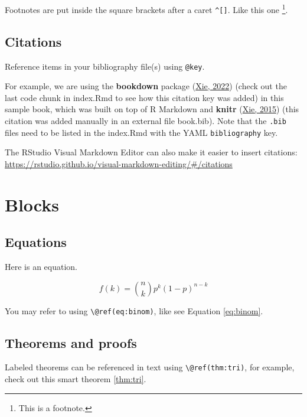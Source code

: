 \documentclass[
  12pt,
]{book}
\theoremstyle{definition}
\theoremstyle{definition}
\theoremstyle{definition}
\theoremstyle{definition}
\theoremstyle{remark}
\begin{document}
Footnotes are put inside the square brackets after a caret \texttt{\^{}{[}{]}}. Like this one \footnote{This is a footnote.}.

\hypertarget{citations}{%
\section{Citations}\label{citations}}

Reference items in your bibliography file(s) using \texttt{@key}.

For example, we are using the \textbf{bookdown} package (\protect\hyperlink{ref-R-bookdown}{Xie, 2022}) (check out the last code chunk in index.Rmd to see how this citation key was added) in this sample book, which was built on top of R Markdown and \textbf{knitr} (\protect\hyperlink{ref-xie2015}{Xie, 2015}) (this citation was added manually in an external file book.bib).
Note that the \texttt{.bib} files need to be listed in the index.Rmd with the YAML \texttt{bibliography} key.

The RStudio Visual Markdown Editor can also make it easier to insert citations: \url{https://rstudio.github.io/visual-markdown-editing/\#/citations}

\hypertarget{blocks}{%
\chapter{Blocks}\label{blocks}}

\hypertarget{equations}{%
\section{Equations}\label{equations}}

Here is an equation. 

\begin{equation} 
  f\left(k\right) = \binom{n}{k} p^k\left(1-p\right)^{n-k}
  \label{eq:binom}
\end{equation}

You may refer to using \texttt{\textbackslash{}@ref(eq:binom)}, like see Equation \eqref{eq:binom}.

\hypertarget{theorems-and-proofs}{%
\section{Theorems and proofs}\label{theorems-and-proofs}}

Labeled theorems can be referenced in text using \texttt{\textbackslash{}@ref(thm:tri)}, for example, check out this smart theorem \ref{thm:tri}.
\end{document}
